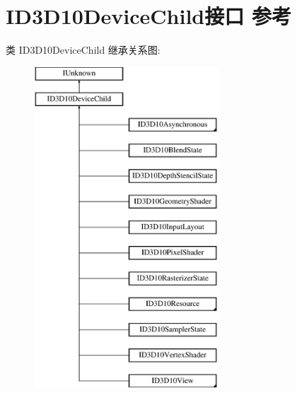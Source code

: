 \hypertarget{interface_i_d3_d10_device_child}{}\section{I\+D3\+D10\+Device\+Child接口 参考}
\label{interface_i_d3_d10_device_child}
类 I\+D3\+D10\+Device\+Child 继承关系图\+:\begin{figure}[H]
\begin{center}
\leavevmode
\includegraphics[height=12.000000cm]{interface_i_d3_d10_device_child}
\end{center}
\end{figure}
